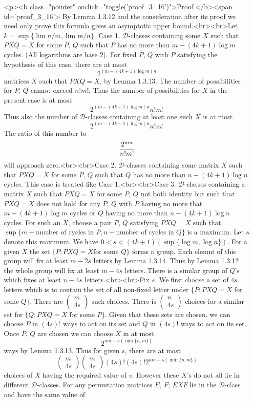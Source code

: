{{            <p><b class="pointer" onclick="toggle('proof_3_16')">Proof.</b><span id='proof_3_16'> By Lemma 1.3.12 and the consideration after its proof we need only prove this formula gives an asymptotic upper bound.<br><br>Let $k=\sup\{\lim n/m, \lim m/n\}$. Case 1. $\mathcal{D}$-classes containing some $X$ such that $PXQ=X$ for some $P$, $Q$ such that $P$ has no more than $m-(4k+1)\log m$ cycles. (All logarithms are base 2). For fixed $P$, $Q$ with $P$ satisfying the hypothesis of this case, there are at most $$2^{(m-(4k+1)\log m)n}$$ matrices $X$ such that $PXQ=X$, by Lemma 1.3.13. The number of possibilities for $P$, $Q$ cannot exceed $n!m!$. Thus the number of possibilities for $X$ in the present case is at most $$2^{(m-(4k+1)\log m)n}n!m!$$ Thus also the number of $\mathcal{D}$-classes containing at least one such $X$ is at most $$2^{(m-(4k+1)\log m)n}n!m!$$ The ratio of this number to $${2^{nm} \over n!m!}$$ will approach zero.<br><br>Case 2. $\mathcal{D}$-classes containing some matrix $X$ such that $PXQ=X$ for some $P$, $Q$ such that $Q$ has no more than $n-(4k+1)\log n$ cycles. This case is treated like Case 1.<br><br>Case 3. $\mathcal{D}$-classes containing a matrix $X$ such that $PXQ=X$ for some $P$, $Q$ not both identity but such that $PXQ=X$ does not hold for any $P$, $Q$ with $P$ having no more that $m-(4k+1)\log m$ cycles or $Q$ having no more than $n-(4k+1)\log n$ cycles. For such an $X$, choose a pair $P$, $Q$ satisfying $PXQ=X$ such that $\sup \{m-$number of cycles in $P, n-$number of cycles in $Q\}$ is a maximum. Let $s$ denote this maximum. We have $0 < s < (4k+1)(\sup\{\log m, \log n\})$. For a given $X$ the set $\{P: PXQ=X $for some $Q\}$ forms a group. Each elemnt of this group will fix at least $m-2s$ letters by Lemma 1.3.14. Thus by Lemma 1.3.12 the whole group will fix at least $m-4s$ letters. There is a similar group of $Q$'s which fixes at least $n-4s$ letters.<br><br>Fix $s$. We first choose a set of $4s$ letters which is to contain the set of all non-fixed letter under $\{P: PXQ=X$ for some $Q\}$. There are $\begin{pmatrix}m \\ 4s \end{pmatrix}$ such choices. There is $\begin{pmatrix}n \\ 4s\end{pmatrix}$ choices for a similar set for $\{Q: PXQ=X$ for some $P\}$. Given that these sets are chosen, we can choose $P$ in $(4s)!$ ways to act on its set and $Q$ in $(4s)!$ ways to act on its set. Once $P$, $Q$ are chosen we can choose $X$ in at most $$2^{nm-s(\min\{n,m\})}$$ ways by Lemma 1.3.13. Thus for given $s$, there are at most $$\begin{pmatrix}m \\ 4s\end{pmatrix} \begin{pmatrix}m \\ 4s\end{pmatrix} (4s)! (4s)! 2^{nm - s (\min\{n, m\})}$$ choices of $X$ having the required value of $s$. However these $X$'s do not all lie in different $\mathcal{D}$-classes. For any permutation matrices $E$, $F$; $EXF$ lie in the $\mathcal{D}$-class and have the same value of }}
